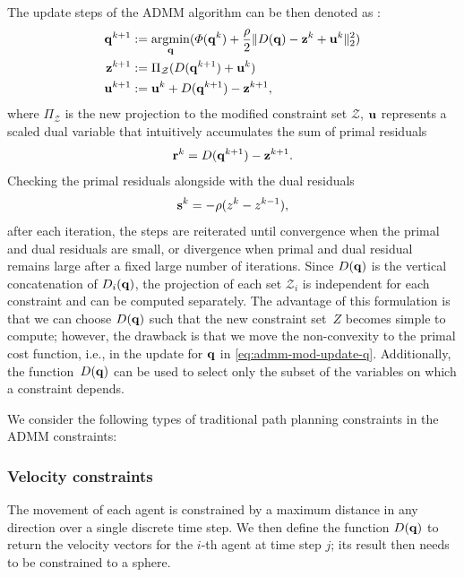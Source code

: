 \documentclass[journal]{IEEEtran}  %
\begin{document}
The update steps of the ADMM algorithm can be then denoted as \cite{Boyd2011}:
\begin{subequations}\label{eq:ADMMupdate}
	\begin{align}
		\label{eq:admm-mod-update-q}\mathbf{q}^{k+1}&:=\operatorname*{\arg\!\min}_{\mathbf{q}}(\varPhi(\mathbf{q}^k) +\frac{\rho}{2}\lVert D(\mathbf{q})-\mathbf{z}^k+\mathbf{u}^k\rVert_2^2)\\
		\mathbf{z}^{k+1}&:=\Pi_\mathcal{Z}(D(\mathbf{q}^{k+1})+\mathbf{u}^k) \\
		\mathbf{u}^{k+1}&:=\mathbf{u}^k+D(\mathbf{q}^{k+1})-\mathbf{z}^{k+1},
	\end{align}
\end{subequations}
where $\Pi_\mathcal{Z}$ is the new projection to the modified constraint set $\mathcal{Z}$, $\mathbf{u}$ represents a scaled dual variable that intuitively accumulates the sum of primal residuals
\begin{equation}\label{eq:primal-residual}
	\mathbf{r}^{k}=D(\mathbf{q}^{k+1})-\mathbf{z}^{k+1}.
\end{equation}
Checking the primal residuals alongside with the dual residuals 
\begin{equation}\label{eq:dual-residual}
	\mathbf{s}^{k}=-\rho(z^{k}-z^{k-1}),
\end{equation}
after each iteration, the steps are reiterated until convergence when the primal and dual residuals are small, or divergence when primal and dual residual remains large after a fixed large number of iterations.
Since $D(\mathbf{q})$ is the vertical concatenation of $D_i(\mathbf{q})$, the projection of each set $\mathcal{Z}_i$ is independent for each constraint and can be computed separately. The advantage of this formulation is that we can choose $D(\mathbf{q})$ such that the new constraint set~$Z$ becomes simple to compute; however, the drawback is that we move the non-convexity to the primal cost function, i.e., in the update for $\mathbf{q}$ in \eqref{eq:admm-mod-update-q}.
Additionally, the function~$D(\mathbf{q})$ can be used to select only the subset of the variables on which a constraint depends. 

We consider the following types of traditional path planning constraints in the ADMM constraints:
\subsubsection*{Velocity constraints}
  The movement of each agent is constrained by a maximum distance in any direction over a single discrete time step. We then define the function $D(\mathbf{q})$ to return the velocity vectors for the $i$-th agent at time step $j$; its result then needs to be constrained to a sphere.
\end{document}
